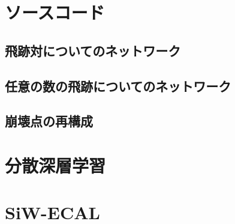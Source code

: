 
\appendix 

\chapter{ソースコード} \label{sec:Code}
\section{飛跡対についてのネットワーク} \label{sec:CodePairModel}
\section{任意の数の飛跡についてのネットワーク} \label{sec:CodeVLSTM}
\section{崩壊点の再構成} \label{sec:CodePairProduction}

\chapter{分散深層学習} \label{sec:MultiDistribution}

\chapter{SiW-ECAL} \label{sec:SiWECAL}
